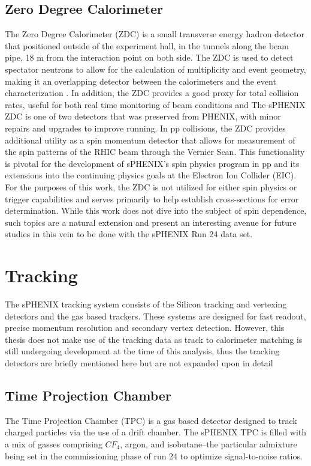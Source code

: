 	\subsection{Zero Degree Calorimeter}
		The Zero Degree Calorimeter (ZDC) is a small transverse energy hadron detector that positioned outside of the experiment hall, in the tunnels along the beam pipe, 18 m from the interaction point on both side.
		The ZDC is used to detect spectator neutrons to allow for the calculation of multiplicity and event geometry, making it an overlapping detector between the calorimeters and the event characterization \cite{sphenix_ZDC}. 
		In addition, the ZDC provides a good proxy for total collision rates, useful for both real time monitoring of beam conditions and 
		The sPHENIX ZDC is one of two detectors that was preserved from PHENIX, with minor repairs and upgrades to improve running.
		In pp collisions, the ZDC provides additional utility as a spin momentum detector that allows for measurement of the spin patterns of the RHIC beam through the Vernier Scan. 
		This functionality is pivotal for the development of sPHENIX's spin physics program in pp and its extensions into the continuing physics goals at the Electron Ion Collider (EIC)\cite{sphenix_ZDC}.
		For the purposes of this work, the ZDC is not utilized for either spin physics or trigger capabilities and serves primarily to help establish cross-sections for error determination. 
		While this work does not dive into the subject of spin dependence, such topics are a natural extension and present an interesting avenue for future studies in this vein to be done with the sPHENIX Run 24 data set. 

\section{Tracking}
	The sPHENIX tracking system consists of the Silicon tracking and vertexing detectors and the gas based trackers.
	These systems are designed for fast readout, precise momentum resolution and secondary vertex detection. 
	However, this thesis does not make use of the tracking data as track to calorimeter matching is still undergoing development at the time of this analysis, thus the tracking detectors are briefly mentioned here but are not expanded upon in detail
	\subsection{Time Projection Chamber}
	The Time Projection Chamber (TPC) is a gas based detector designed to track charged particles via the use of a drift chamber. 
	The sPHENIX TPC is filled with a mix of gasses comprising $CF_4$, argon, and isobutane--the particular admixture being set in the commissioning phase of run 24 to optimize signal-to-noise ratios. 
